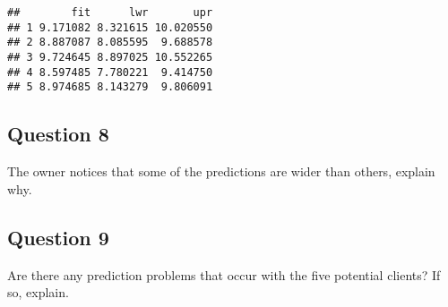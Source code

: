 \documentclass[
]{article}
\begin{document}
\begin{verbatim}
##        fit      lwr       upr
## 1 9.171082 8.321615 10.020550
## 2 8.887087 8.085595  9.688578
## 3 9.724645 8.897025 10.552265
## 4 8.597485 7.780221  9.414750
## 5 8.974685 8.143279  9.806091
\end{verbatim}

\subsection{Question 8}\label{question-8}

The owner notices that some of the predictions are wider than others,
explain why.

\subsection{Question 9}\label{question-9}

Are there any prediction problems that occur with the five potential
clients? If so, explain.
\end{document}
